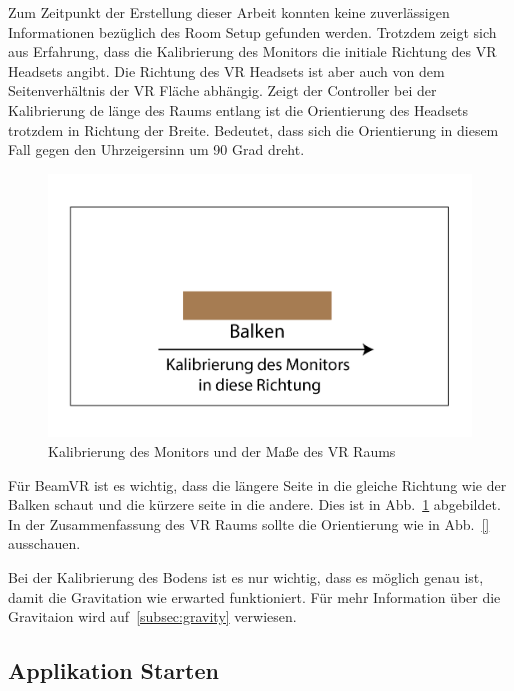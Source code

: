 Zum Zeitpunkt der Erstellung dieser Arbeit konnten keine zuverlässigen Informationen bezüglich des Room Setup gefunden werden.
Trotzdem zeigt sich aus Erfahrung, dass die Kalibrierung des Monitors die initiale Richtung des VR Headsets angibt.
Die Richtung des VR Headsets ist aber auch von dem Seitenverhältnis der VR Fläche abhängig.
Zeigt der Controller bei der Kalibrierung de länge des Raums entlang ist die Orientierung des Headsets trotzdem in Richtung der Breite.
Bedeutet, dass sich die Orientierung in diesem Fall gegen den Uhrzeigersinn um 90 Grad dreht.

\begin{figure}
    \centering
    \includegraphics[scale=0.2]{pics/monitor_calibration}
    \caption{Kalibrierung des Monitors und der Maße des VR Raums}
    \label{fig:steam-vr-calibration}
\end{figure}


Für BeamVR ist es wichtig, dass die längere Seite in die gleiche Richtung wie der Balken schaut und die kürzere seite in die andere.
Dies ist in Abb.~\ref{fig:steam-vr-calibration} abgebildet.
In der Zusammenfassung des VR Raums sollte die Orientierung wie in Abb.~\ref{} ausschauen.


Bei der Kalibrierung des Bodens ist es nur wichtig, dass es möglich genau ist, damit die Gravitation wie erwarted funktioniert.
Für mehr Information über die Gravitaion wird auf~\ref{subsec:gravity} verwiesen.

\subsection{Applikation Starten}\label{subsec:run-application}


